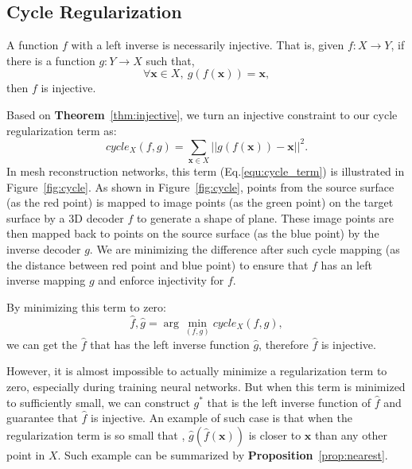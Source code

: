 \subsection{Cycle Regularization}
\label{subsec:cyclereg}
\label{subsec:inj}
\begin{m_thm}
\label{thm:injective}
A function $f$ with a left inverse is necessarily injective. That is, given $f:X \rightarrow Y$, if there is a function $g:Y \rightarrow X$ such that,
\begin{equation}
\label{equ:injective}
\forall \mathbf{x} \in X,~g(f(\mathbf{x})) = \mathbf{x},
\end{equation}
then $f$ is injective.
\end{m_thm}

Based on \textbf{Theorem}~\ref{thm:injective}, we turn an injective constraint to our cycle regularization term as:
\begin{equation}
\label{equ:cycle_term}
cycle_X(f,g)=\sum_{\mathbf{x}\in X}||g(f(\mathbf{x})) - \mathbf{x}||^2.
\end{equation}
In mesh reconstruction networks, this term (Eq.\ref{equ:cycle_term}) is illustrated in Figure~\ref{fig:cycle}. As shown in Figure~\ref{fig:cycle}, points from the source surface (as the red point) is mapped to image points (as the green point) on the target surface by a 3D decoder $f$ to generate a shape of plane. These image points are then mapped back to points on the source surface (as the blue point) by the inverse decoder $g$. We are minimizing the difference after such cycle mapping (as the distance between red point and blue point) to ensure that $f$ has an left inverse mapping $g$ and enforce injectivity for $f$. 

By minimizing this term to zero:
\begin{equation}
\hat{f},\hat{g} = \arg\min_{(f,g)} cycle_X(f,g),
\end{equation}
we can get the $\hat{f}$ that has the left inverse function $\hat{g}$, therefore $\hat{f}$ is injective. 

However, it is almost impossible to actually minimize a regularization term to zero, especially during training neural networks. But when this term is minimized to sufficiently small, we can construct $g^*$ that is the left inverse function of $\hat{f}$ and guarantee that $\hat{f}$ is injective. An example of such case is that when the regularization term is so small that , $\hat{g}(\hat{f}(\mathbf{x}))$ is closer to $\mathbf{x}$ than any other point in $X$. Such example can be summarized by \textbf{Proposition}~\ref{prop:nearest}.

